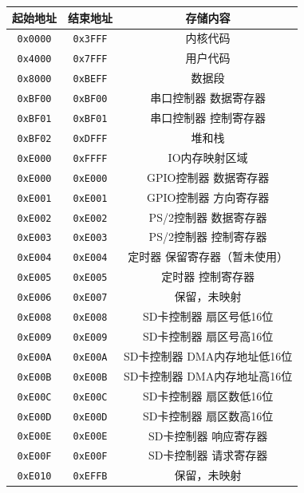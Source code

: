 \documentclass[11pt,utf8]{report}
\begin{document}
\begin{table}[h]
\centering
\begin{tabular}{c|c|c}
\toprule[1.2pt]
\textbf{起始地址} & \textbf{结束地址} & \textbf{存储内容} \\
\midrule[1.2pt]
\texttt{0x0000} & \texttt{0x3FFF} & 内核代码 \\ \hline
\texttt{0x4000} & \texttt{0x7FFF} & 用户代码 \\ \hline
\texttt{0x8000} & \texttt{0xBEFF} & 数据段 \\ \hline
\texttt{0xBF00} & \texttt{0xBF00} & 串口控制器 数据寄存器 \\ \hline
\texttt{0xBF01} & \texttt{0xBF01} & 串口控制器 控制寄存器 \\ \hline
\texttt{0xBF02} & \texttt{0xDFFF} & 堆和栈 \\ \hline
\texttt{0xE000} & \texttt{0xFFFF} & IO内存映射区域 \\ \hline
\texttt{0xE000} & \texttt{0xE000} & GPIO控制器 数据寄存器 \\ \hline
\texttt{0xE001} & \texttt{0xE001} & GPIO控制器 方向寄存器 \\ \hline
\texttt{0xE002} & \texttt{0xE002} & PS/2控制器 数据寄存器 \\ \hline
\texttt{0xE003} & \texttt{0xE003} & PS/2控制器 控制寄存器 \\ \hline
\texttt{0xE004} & \texttt{0xE004} & 定时器 保留寄存器（暂未使用） \\ \hline
\texttt{0xE005} & \texttt{0xE005} & 定时器 控制寄存器 \\ \hline
\texttt{0xE006} & \texttt{0xE007} & 保留，未映射 \\ \hline
\texttt{0xE008} & \texttt{0xE008} & SD卡控制器 扇区号低16位 \\ \hline
\texttt{0xE009} & \texttt{0xE009} & SD卡控制器 扇区号高16位 \\ \hline
\texttt{0xE00A} & \texttt{0xE00A} & SD卡控制器 DMA内存地址低16位 \\ \hline
\texttt{0xE00B} & \texttt{0xE00B} & SD卡控制器 DMA内存地址高16位 \\ \hline
\texttt{0xE00C} & \texttt{0xE00C} & SD卡控制器 扇区数低16位 \\ \hline
\texttt{0xE00D} & \texttt{0xE00D} & SD卡控制器 扇区数高16位 \\ \hline
\texttt{0xE00E} & \texttt{0xE00E} & SD卡控制器 响应寄存器 \\ \hline
\texttt{0xE00F} & \texttt{0xE00F} & SD卡控制器 请求寄存器 \\ \hline
\texttt{0xE010} & \texttt{0xEFFB} & 保留，未映射 \\ \hline

\end{tabular}
\end{table}
\end{document}
